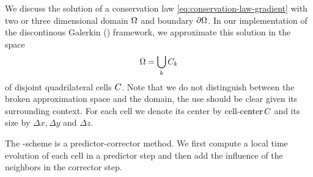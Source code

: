 We discuss the solution of a conservation law \cref{eq:conservation-law-gradient} with two or three dimensional domain $\Omega$ and boundary $\partial \Omega$.
In our implementation of the discontinous Galerkin (\dg) framework, we approximate this solution in the space
\begin{equation}
  \label{eq:dg-space}
  \broken = \bigcup_k \cell[k]
\end{equation}
of disjoint quadrilateral cells $C_{}$.
Note that we do not distinguish between the broken approximation space and the domain, the use should be clear given its surrounding context.
For each cell we denote its center by $\operatorname{cell-center}{C_{}}$ and its size by $\Delta x, \Delta y$ and $\Delta z$.

The \aderdg{}-scheme is a predictor-corrector method.
We first compute a local time evolution of each cell in a predictor step and then add the influence of the neighbors in the corrector step.

